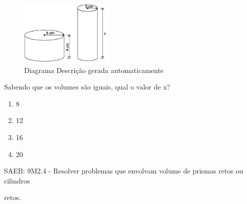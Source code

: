 \begin{escolha}
\begin{boxmedio}
\begin{boxmedio}
{\begin{boxpeq}
\begin{boxpeq}
{\begin{boxpeq}
\begin{boxmedio}
\begin{boxmedio}
\begin{boxpeq}
\begin{boxmedio}
\begin{boxpeq}
\begin{boxpeq}
\begin{boxpeq}
\begin{boxpeq}
\begin{boxmedio}
{\begin{boxmedio}
\begin{boxmedio}
\begin{boxpeq}
\begin{boxmedio}
\begin{boxpeq}
\begin{boxpeq}
\begin{boxpeq}
\begin{escolha}
{\begin{boxmedio}
\begin{boxpeq}
\begin{boxpeq}
\begin{boxpeq}
\begin{boxpeq}
\begin{boxpeq}
\begin{boxmedio}
\begin{boxpeq}
\begin{boxpeq}
\begin{boxpeq}
{\begin{boxpeq}
\begin{boxmedio}
\begin{boxpeq}
\begin{boxpeq}
\begin{boxpeq}
{\begin{boxpeq}
\begin{boxmedio}
{\begin{boxpeq}
\begin{boxpeq}
\begin{boxmedio}
\begin{boxmedio}
\begin{boxpeq}
\begin{boxpeq}
{\begin{boxpeq}
\begin{boxpeq}
\begin{boxpeq}
\begin{boxpeq}
\begin{boxpeq}
\begin{escolha}
\begin{escolha}
{\begin{boxmedio}
\begin{boxpeq}
\begin{q°}
\begin{boxmedio}
\begin{boxpeq}
\begin{boxpeq}
\begin{boxmedio}
\begin{boxmedio}
\begin{boxmedio}
\begin{boxmedio}
{\begin{escolha}
\begin{escolha}
\begin{escolha}
\begin{escolha}
\begin{escolha}
\begin{escolha}
{\begin{figure}
\centering
\includegraphics[width=1.77016in,height=1.22917in]{./_SAEB_9_MAT/media/image280.png}
\caption{Diagrama Descrição gerada automaticamente}
\end{figure}

Sabendo que os volumes são iguais, qual o valor de x?

\begin{enumerate}

\item
  8
\item
  12
\item
  16
\item
  20
\end{enumerate}

SAEB: 9M2.4 - Resolver problemas que envolvam volume de prismas retos ou
cilindros

retos.

}
\end{escolha}
\end{escolha}
\end{escolha}
\end{escolha}
\end{escolha}
\end{escolha}}
\end{boxmedio}
\end{boxmedio}
\end{boxmedio}
\end{boxmedio}
\end{boxpeq}
\end{boxpeq}
\end{boxmedio}
\end{q°}
\end{boxpeq}
\end{boxmedio}}
\end{escolha}
\end{escolha}
\end{boxpeq}
\end{boxpeq}
\end{boxpeq}
\end{boxpeq}
\end{boxpeq}}
\end{boxpeq}
\end{boxpeq}
\end{boxmedio}
\end{boxmedio}
\end{boxpeq}
\end{boxpeq}}
\end{boxmedio}
\end{boxpeq}}
\end{boxpeq}
\end{boxpeq}
\end{boxpeq}
\end{boxmedio}
\end{boxpeq}}
\end{boxpeq}
\end{boxpeq}
\end{boxpeq}
\end{boxmedio}
\end{boxpeq}
\end{boxpeq}
\end{boxpeq}
\end{boxpeq}
\end{boxpeq}
\end{boxmedio}}
\end{escolha}
\end{boxpeq}
\end{boxpeq}
\end{boxpeq}
\end{boxmedio}
\end{boxpeq}
\end{boxmedio}
\end{boxmedio}}
\end{boxmedio}
\end{boxpeq}
\end{boxpeq}
\end{boxpeq}
\end{boxpeq}
\end{boxmedio}
\end{boxpeq}
\end{boxmedio}
\end{boxmedio}
\end{boxpeq}}
\end{boxpeq}
\end{boxpeq}}
\end{boxmedio}
\end{boxmedio}
\end{escolha}

